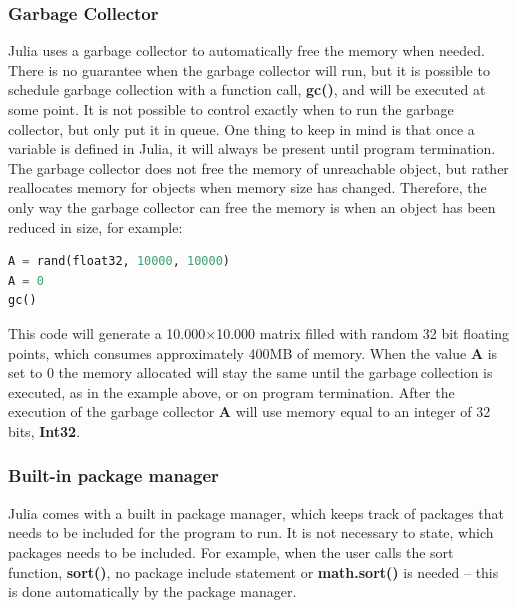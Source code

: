 \documentclass[a4paper, 11pt, titlepage]{article}
\begin{document}
\subsubsection{Garbage Collector}
Julia uses a garbage collector to automatically free the memory when needed. There is no guarantee when the garbage collector will run, but it is possible to schedule garbage collection with a function call, \textbf{gc()}, and will be executed at some point. It is not possible to control exactly when to run the garbage collector, but only put it in queue. One thing to keep in mind is that once a variable is defined in Julia, it will always be present until program termination. The garbage collector does not free the memory of unreachable object, but rather reallocates memory for objects when memory size has changed. Therefore, the only way the garbage collector can free the memory is when an object has been reduced in size, for example:

\begin{lstlisting}[language=python]
A = rand(float32, 10000, 10000) 
A = 0
gc() 
\end{lstlisting}
This code will generate a 10.000$\times$10.000 matrix filled with random 32 bit floating points, which consumes approximately 400MB of memory. When the value \textbf{A} is set to 0 the memory allocated will stay the same until the garbage collection is executed, as in the example above, or on program termination. After the execution of the garbage collector \textbf{A} will use memory equal to an integer of 32 bits, \textbf{Int32}.

\subsubsection{Built-in package manager}
Julia comes with a built in package manager, which keeps track of packages that needs to be included for the program to run. It is not necessary to state, which packages needs to be included. For example, when the user calls the sort function, \textbf{sort()}, no package include statement or \textbf{math.sort()} is needed – this is done automatically by the package manager.
\end{document}

